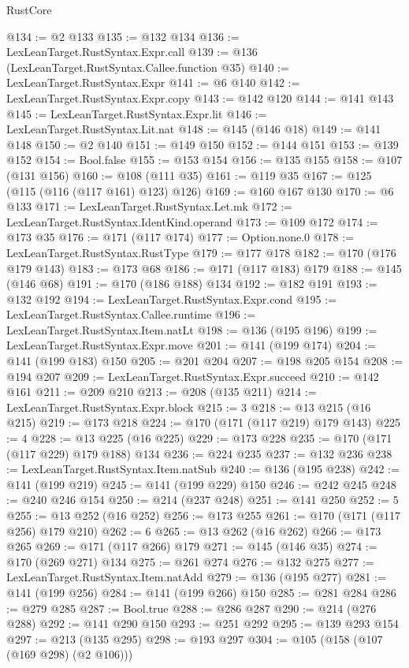 \begin{lexlean}{RustCore}
\begin{coremodule}
@134 := @2 @133
@135 := @132 @134
@136 := LexLeanTarget.RustSyntax.Expr.call
@139 := @136 (LexLeanTarget.RustSyntax.Callee.function @35)
@140 := LexLeanTarget.RustSyntax.Expr
@141 := @6 @140
@142 := LexLeanTarget.RustSyntax.Expr.copy
@143 := @142 @120
@144 := @141 @143
@145 := LexLeanTarget.RustSyntax.Expr.lit
@146 := LexLeanTarget.RustSyntax.Lit.nat
@148 := @145 (@146 @18)
@149 := @141 @148
@150 := @2 @140
@151 := @149 @150
@152 := @144 @151
@153 := @139 @152
@154 := Bool.false
@155 := @153 @154
@156 := @135 @155
@158 := @107 (@131 @156)
@160 := @108 (@111 @35)
@161 := @119 @35
@167 := @125 (@115 (@116 (@117 @161) @123) @126)
@169 := @160 @167 @130
@170 := @6 @133
@171 := LexLeanTarget.RustSyntax.Let.mk
@172 := LexLeanTarget.RustSyntax.IdentKind.operand
@173 := @109 @172
@174 := @173 @35
@176 := @171 (@117 @174)
@177 := Option.none.{0}
@178 := LexLeanTarget.RustSyntax.RustType
@179 := @177 @178
@182 := @170 (@176 @179 @143)
@183 := @173 @68
@186 := @171 (@117 @183) @179
@188 := @145 (@146 @68)
@191 := @170 (@186 @188) @134
@192 := @182 @191
@193 := @132 @192
@194 := LexLeanTarget.RustSyntax.Expr.cond
@195 := LexLeanTarget.RustSyntax.Callee.runtime
@196 := LexLeanTarget.RustSyntax.Item.natLt
@198 := @136 (@195 @196)
@199 := LexLeanTarget.RustSyntax.Expr.move
@201 := @141 (@199 @174)
@204 := @141 (@199 @183) @150
@205 := @201 @204
@207 := @198 @205 @154
@208 := @194 @207
@209 := LexLeanTarget.RustSyntax.Expr.succeed
@210 := @142 @161
@211 := @209 @210
@213 := @208 (@135 @211)
@214 := LexLeanTarget.RustSyntax.Expr.block
@215 := 3
@218 := @13 @215 (@16 @215)
@219 := @173 @218
@224 := @170 (@171 (@117 @219) @179 @143)
@225 := 4
@228 := @13 @225 (@16 @225)
@229 := @173 @228
@235 := @170 (@171 (@117 @229) @179 @188) @134
@236 := @224 @235
@237 := @132 @236
@238 := LexLeanTarget.RustSyntax.Item.natSub
@240 := @136 (@195 @238)
@242 := @141 (@199 @219)
@245 := @141 (@199 @229) @150
@246 := @242 @245
@248 := @240 @246 @154
@250 := @214 (@237 @248)
@251 := @141 @250
@252 := 5
@255 := @13 @252 (@16 @252)
@256 := @173 @255
@261 := @170 (@171 (@117 @256) @179 @210)
@262 := 6
@265 := @13 @262 (@16 @262)
@266 := @173 @265
@269 := @171 (@117 @266) @179
@271 := @145 (@146 @35)
@274 := @170 (@269 @271) @134
@275 := @261 @274
@276 := @132 @275
@277 := LexLeanTarget.RustSyntax.Item.natAdd
@279 := @136 (@195 @277)
@281 := @141 (@199 @256)
@284 := @141 (@199 @266) @150
@285 := @281 @284
@286 := @279 @285
@287 := Bool.true
@288 := @286 @287
@290 := @214 (@276 @288)
@292 := @141 @290 @150
@293 := @251 @292
@295 := @139 @293 @154
@297 := @213 (@135 @295)
@298 := @193 @297
@304 := @105 (@158 (@107 (@169 @298) (@2 @106)))

\end{coremodule}
\end{lexlean}
